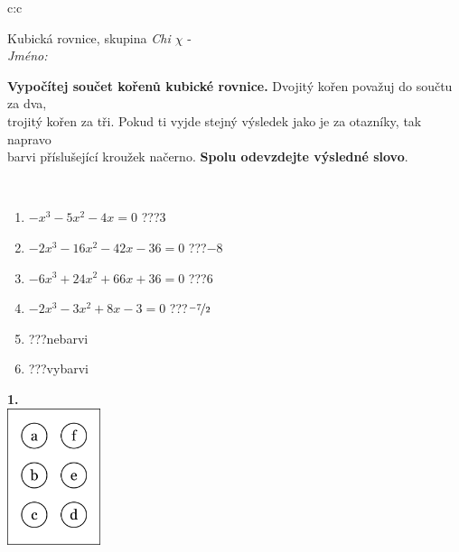 \documentclass[10pt]{report}
\begin{document}
\begin{tabular}{c:c}
\begin{minipage}[c][104.5mm][t]{0.5\linewidth}
\begin{center}
\vspace{7mm}
{\huge Kubická rovnice, skupina \textit{Chi $\chi$} -}\\[5mm]
\textit{Jméno:}\phantom{xxxxxxxxxxxxxxxxxxxxxxxxxxxxxxxxxxxxxxxxxxxxxxxxxxxxxxxxxxxxxxxxx}\\[5mm]
\begin{minipage}{0.95\linewidth}
\begin{center}
\textbf{Vypočítej součet kořenů kubické rovnice.} Dvojitý kořen považuj do součtu za dva,\\trojitý kořen za tři. Pokud ti vyjde stejný výsledek jako je za otazníky, tak napravo\\barvi příslušející kroužek načerno. \textbf{Spolu odevzdejte výsledné slovo}.
\end{center}
\end{minipage}
\\[1mm]
\begin{minipage}{0.79\linewidth}
\begin{center}
\begin{varwidth}{\linewidth}
\begin{enumerate}
\Large
\item $-x^3-5x^2-4x=0$\quad \dotfill\; ???\;\dotfill \quad $3$
\item $-2x^3-16x^2-42x-36=0$\quad \dotfill\; ???\;\dotfill \quad $-8$
\item $-6x^3+24x^2+66x+36=0$\quad \dotfill\; ???\;\dotfill \quad $6$
\item $-2x^3-3x^2+8x-3=0$\quad \dotfill\; ???\;\dotfill \quad $\nicefrac{-7}{2}$
\item \quad \dotfill\; ???\;\dotfill \quad nebarvi
\item \quad \dotfill\; ???\;\dotfill \quad vybarvi
\end{enumerate}
\end{varwidth}
\end{center}
\end{minipage}
\begin{minipage}{0.20\linewidth}
\begin{center}
{\Huge\bfseries 1.} \\[2mm]
\includegraphics[height=40mm]{../images/braille.png}

\end{center}
\end{minipage}
\end{center}
\end{minipage}
\end{tabular}
\end{document}
